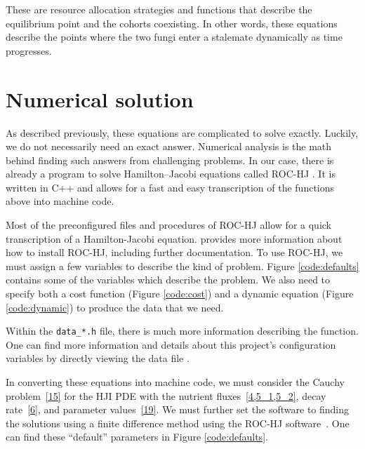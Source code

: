 \documentclass[11pt]{amsart}
\begin{document}
These are resource allocation strategies and functions that describe the equilibrium point and the cohorts coexisting. In other words, these equations describe the points where the two fungi enter a stalemate dynamically as time progresses. 



\section{Numerical solution}
As described previously, these equations are complicated to solve exactly. Luckily, we do not necessarily need an exact answer. Numerical analysis is the math behind finding such answers from challenging problems. In our case, there is already a program to solve Hamilton--Jacobi equations called ROC-HJ \cite{ROCHJ2019}. It is written in C++ and allows for a fast and easy
transcription of the functions above into machine code. 

Most of the preconfigured files and procedures of ROC-HJ allow for a quick transcription
of a Hamilton-Jacobi equation. \cite{ROCHJ2019} provides more information about how to install ROC-HJ, including further documentation. To use ROC-HJ, we must assign a few variables to describe the kind
of problem. Figure \ref{code:defaults} contains some of the variables which
describe the problem. We also need to specify both a cost function (Figure \ref{code:cost}) and a dynamic equation (Figure \ref{code:dynamic}) to produce the data that we need.


Within the \texttt{data\_*.h} file, there is much more information describing
the function. One can find more information and details about this project's
configuration variables by directly viewing the data file \cite{data_ivan.h}.

In converting these equations into machine code, we must consider the Cauchy problem~\cref{15} for the HJI PDE with the nutrient
fluxes~\cref{4,5_1,5_2}, decay rate~\cref{6}, and parameter values~\cref{19}. We must further set the software to finding the solutions using a finite difference method 
\cite{FlemingSoner2006,
      OsherShu1991,
      BotkinHoffmannTurova2011,
      BokanForcadelZidani2010}
using the ROC-HJ software~\cite{ROCHJ2019}. One can find these ``default'' parameters in Figure \ref{code:defaults}.
\end{document}

